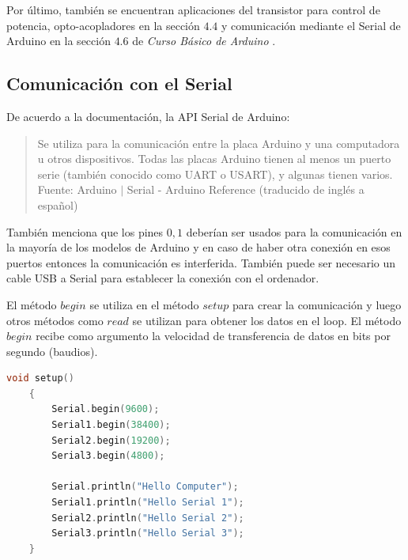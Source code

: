 \documentclass{article}
\begin{document}
    \bigbreak

    Por último, también se encuentran aplicaciones del transistor para
    control de potencia, opto-acopladores en la sección $4.4$ y comunicación
    mediante el Serial de Arduino en la sección $4.6$ de \textit{Curso Básico
    de Arduino} \cite{flores-2018}.

    \subsection{Comunicación con el Serial}

    De acuerdo a la documentación, la API Serial de Arduino:

    \begin{quote}
        Se utiliza para la comunicación entre la placa Arduino y una
        computadora u otros dispositivos. Todas las placas Arduino tienen al
        menos un puerto serie (también conocido como UART o USART), y algunas
        tienen varios.\\ \footnotesize
        Fuente: Arduino $\mid$ Serial - Arduino Reference (traducido de
        inglés a español) \cite{arduino-serial}
    \end{quote}

    También menciona que los pines $0,1$ deberían ser usados para la
    comunicación en la mayoría de los modelos de Arduino y en caso de haber
    otra conexión en esos puertos entonces la comunicación es interferida.
    También puede ser necesario un cable USB a Serial para establecer la
    conexión con el ordenador.

    \bigbreak

    El método $begin$ se utiliza en el método $setup$ para crear la
    comunicación y luego otros métodos como $read$ se utilizan para obtener
    los datos en el loop. El método $begin$ recibe como argumento la
    velocidad de transferencia de datos en bits por segundo (baudios).

    \bigbreak

    \begin{lstlisting}[language=C, caption=Uso de Serial en Arduino Mega con
    todos sus puertos Seriales. \footnotesize Fuente: Serial - Arduino
    Reference (begin) \cite{arduino-serial}]
    void setup()
    {
        Serial.begin(9600);
        Serial1.begin(38400);
        Serial2.begin(19200);
        Serial3.begin(4800);

        Serial.println("Hello Computer");
        Serial1.println("Hello Serial 1");
        Serial2.println("Hello Serial 2");
        Serial3.println("Hello Serial 3");
    }
\end{lstlisting}
\end{document}
